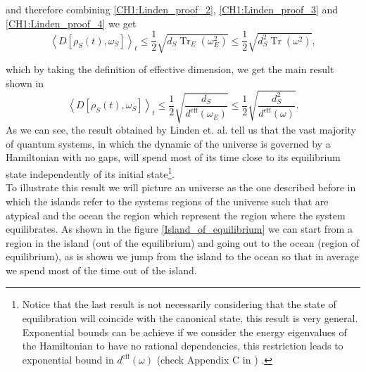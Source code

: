 and therefore combining \eqref{CH1:Linden_proof_2}, \eqref{CH1:Linden_proof_3} and \eqref{CH1:Linden_proof_4} we get
\begin{equation}
\left\langle D\left[\rho_{S}(t), \omega_{S}\right]\right\rangle_{t} \leq \frac{1}{2} \sqrt{d_{S} \operatorname{Tr}_{E}\left(\omega_{E}^{2}\right)} \leq \frac{1}{2} \sqrt{d_{S}^{2} \operatorname{Tr}\left(\omega^{2}\right)},
\label{CH1:Inequality_last}
\end{equation}

which by taking the definition of effective dimension, we get the main result shown in \cite{linden_quantum_2009}
\begin{equation}
\left\langle D\left[\rho_{S}(t), \omega_{S}\right]\right\rangle_{t} \leq \frac{1}{2} \sqrt{\frac{d_{S}}{d^{\mathrm{eff}}\left(\omega_{E}\right)}} \leq \frac{1}{2} \sqrt{\frac{d_{S}^{2}}{d^{\mathrm{eff}}(\omega) }}.
\label{CH1:Result_linden}
\end{equation}
\indent As we can see, the result obtained by Linden et. al. tell us that the vast majority of quantum systems, in which the dynamic of the universe is governed by a Hamiltonian with no gaps, will spend most of its time close to its equilibrium state independently of its initial state\footnote{Notice that the last result is not necessarily considering that the state of equilibration will coincide with the canonical state, this result is very general. Exponential bounds can be achieve if we consider the energy eigenvalues of the Hamiltonian to have no rational dependencies, this restriction leads to exponential bound in $d^{\mathrm{eff}}(\omega)$ (check Appendix C in \cite{linden_quantum_2009}) . }.\\
\indent To illustrate this result we will picture an universe as the one described before in which the islands refer to the systems regions of the universe such that are atypical and the ocean the region which represent the region where the system equilibrates. As shown in the figure 
\ref{Island_of_equilibrium} we can start from a region in the island (out of the equilibrium) and going out to the ocean (region of equilibrium), as is shown we jump from the island to the ocean so that in average we spend most of the time out of the island.
